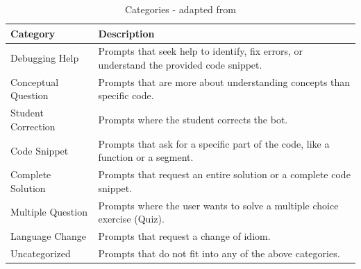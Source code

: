 \documentclass[a4paper,twoside]{article}
\begin{document}



\begin{table}[htbp]
  \caption{Categories - adapted from \cite{Ghimire24}}
  \begin{center}
    \renewcommand{\arraystretch}{1.6} %
    \begin{tabular}{p{3cm} p{12cm}} %
      \hline
      \textbf{Category} & \textbf{Description} \\
      \hline
      Debugging Help & Prompts that seek help to identify, fix errors, or understand the provided code snippet. \\
      Conceptual Question & Prompts that are more about understanding concepts than specific code. \\
      Student Correction & Prompts where the student corrects the bot. \\
      Code Snippet & Prompts that ask for a specific part of the code, like a function or a segment. \\
      Complete Solution & Prompts that request an entire solution or a complete code snippet. \\
      Multiple Question & Prompts where the user wants to solve a multiple choice exercise (Quiz). \\
      Language Change & Prompts that request a change of idiom. \\
      Uncategorized & Prompts that do not fit into any of the above categories. \\
      \hline
    \end{tabular}
    \label{tab:categories}
  \end{center}
\end{table}
\end{document}
